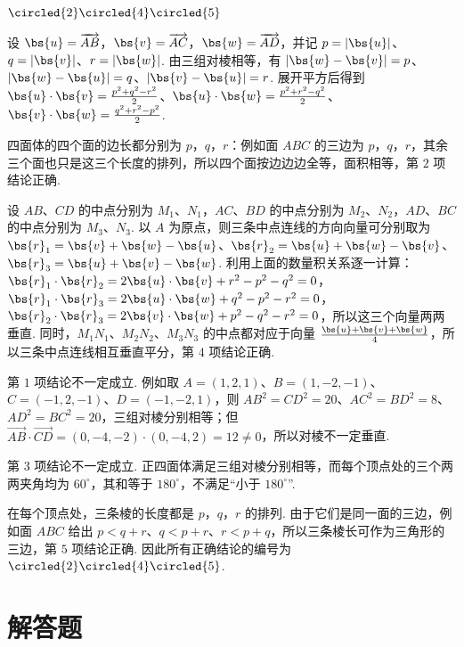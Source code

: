\begin{answer}
\(\circled{2}\circled{4}\circled{5}\)
\end{answer}

\begin{solution}
设 \(\bs{u}=\overrightarrow{AB}\)，\(\bs{v}=\overrightarrow{AC}\)，\(\bs{w}=\overrightarrow{AD}\)，并记 \(p=|\bs{u}|\)、\(q=|\bs{v}|\)、\(r=|\bs{w}|\). 由三组对棱相等，有 \(|\bs{w}-\bs{v}|=p\)、\(|\bs{w}-\bs{u}|=q\)、\(|\bs{v}-\bs{u}|=r\). 展开平方后得到 \(\bs{u}\cdot\bs{v}=\frac{p^2+q^2-r^2}{2}\)、\(\bs{u}\cdot\bs{w}=\frac{p^2+r^2-q^2}{2}\)、\(\bs{v}\cdot\bs{w}=\frac{q^2+r^2-p^2}{2}\).

四面体的四个面的边长都分别为 \(p\)，\(q\)，\(r\)：例如面 \(ABC\) 的三边为 \(p\)，\(q\)，\(r\)，其余三个面也只是这三个长度的排列，所以四个面按边边边全等，面积相等，第 \(2\) 项结论正确.

设 \(AB\)、\(CD\) 的中点分别为 \(M_1\)、\(N_1\)，\(AC\)、\(BD\) 的中点分别为 \(M_2\)、\(N_2\)，\(AD\)、\(BC\) 的中点分别为 \(M_3\)、\(N_3\). 以 \(A\) 为原点，则三条中点连线的方向向量可分别取为
\(\bs{r}_1=\bs{v}+\bs{w}-\bs{u}\)、\(\bs{r}_2=\bs{u}+\bs{w}-\bs{v}\)、\(\bs{r}_3=\bs{u}+\bs{v}-\bs{w}\). 利用上面的数量积关系逐一计算：
\(\bs{r}_1\cdot\bs{r}_2=2\bs{u}\cdot\bs{v}+r^2-p^2-q^2=0\)，
\(\bs{r}_1\cdot\bs{r}_3=2\bs{u}\cdot\bs{w}+q^2-p^2-r^2=0\)，
\(\bs{r}_2\cdot\bs{r}_3=2\bs{v}\cdot\bs{w}+p^2-q^2-r^2=0\)，所以这三个向量两两垂直. 同时，\(M_1N_1\)、\(M_2N_2\)、\(M_3N_3\) 的中点都对应于向量 \(\frac{\bs{u}+\bs{v}+\bs{w}}{4}\)，所以三条中点连线相互垂直平分，第 \(4\) 项结论正确.

第 \(1\) 项结论不一定成立. 例如取 \(A=(1,2,1)\)、\(B=(1,-2,-1)\)、\(C=(-1,2,-1)\)、\(D=(-1,-2,1)\)，则
\(AB^2=CD^2=20\)、\(AC^2=BD^2=8\)、\(AD^2=BC^2=20\)，三组对棱分别相等；但
\(\overrightarrow{AB}\cdot\overrightarrow{CD}=(0,-4,-2)\cdot(0,-4,2)=12\ne0\)，所以对棱不一定垂直.

第 \(3\) 项结论不一定成立. 正四面体满足三组对棱分别相等，而每个顶点处的三个两两夹角均为 \(60^{\circ}\)，其和等于 \(180^{\circ}\)，不满足“小于 \(180^{\circ}\)”.

在每个顶点处，三条棱的长度都是 \(p\)，\(q\)，\(r\) 的排列. 由于它们是同一面的三边，例如面 \(ABC\) 给出 \(p<q+r\)、\(q<p+r\)、\(r<p+q\)，所以三条棱长可作为三角形的三边，第 \(5\) 项结论正确. 因此所有正确结论的编号为 \(\circled{2}\circled{4}\circled{5}\).
\end{solution}

\section{解答题}

